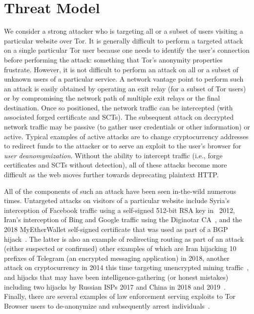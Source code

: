 \section{Threat Model} \label{sec:adversary}

We consider a strong attacker who is targeting all or a subset of users visiting
a particular website over Tor. It is generally difficult to perform a targeted
attack on a single particular Tor user because one needs to identify the user's
connection before performing the attack:
	something that Tor's anonymity properties frustrate.
However, it is not difficult to perform an attack on all or a subset of unknown
users of a particular service. A network vantage point to perform such an attack
is easily obtained by operating an exit relay (for a subset of Tor users) or by
compromising the network path of multiple exit relays or the final destination.
Once so positioned, the network traffic can be intercepted (with associated
forged certificate and SCTs). The subsequent attack on decrypted network traffic
may be passive (to gather user credentials or other information) or active.
Typical examples of active attacks are to change cryptocurrency addresses to
redirect funds to the attacker or to serve an exploit to the user's browser for
\emph{user deanomymization}. Without the ability to intercept traffic (i.e.,
forge certificates and SCTs without detection), all of these attacks become more
difficult as the web moves further towards deprecating plaintext HTTP.

All of the components of such an attack have been seen in-the-wild numerous
times. Untargeted attacks on visitors of a particular website include Syria's
interception of Facebook traffic using a self-signed 512-bit RSA key in ~2012,
Iran's interception of Bing and Google traffic using the Diginotar
CA~\cite{diginotar}, and the 2018 MyEtherWallet self-signed certificate that was
used as part of a BGP hijack~\cite{myetherwallet}.  The latter is also an
example of redirecting routing as part of an attack (either suspected or
confirmed) other examples of which are Iran hijacking 10 prefixes of Telegram
(an encrypted messaging application) in 2018, another attack on cryptocurrency
in 2014 this time targeting unencrypted mining
traffic~\cite{bgp-hijacking-for-crypto,bgp-hijacking-for-crypto-2}, and hijacks
that may have been intelligence-gathering (or honest mistakes) including two
hijacks by Russian ISPs 2017 and China in 2018 and 2019~\cite{wiki-bgp}.
Finally, there are several examples of law enforcement serving exploits to Tor
Browser users to de-anonymize and subsequently arrest
individuals~\cite{de-anonymize-exploit}.

